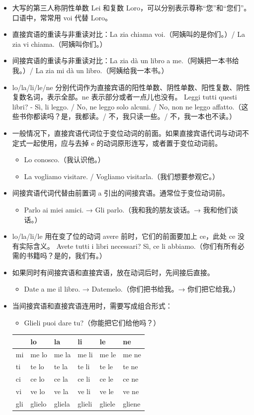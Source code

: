 \documentclass[UTF8,a4paper,titlepage,10pt]{report}
\begin{document}
\begin{enumerate}
\begin{itemize}
\item 大写的第三人称阴性单数 Lei 和复数 Loro，可以分别表示尊称“您”和“您们”。口语中，常常用 voi 代替 Loro。
\item 直接宾语的重读与非重读对比：La zia chiama voi.（阿姨叫的是你们。）/ La zia vi chiama.（阿姨叫你们。）
\item 间接宾语的重读与非重读对比：La zia dà un libro a me.（阿姨把一本书给我。）/ La zia mi dà un libro.（阿姨给我一本书。）
\item lo/la/li/le/ne 分别代词作为直接宾语的阳性单数、阴性单数、阳性复数、阴性复数名词，表示全部。ne 表示部分或者一点儿也没有。
Leggi tutti questi libri? - Sì, li leggo. / No, ne leggo solo alcuni. / No, non ne leggo affatto.（这些书你都读吗？是，我都读。/ 不，我只读一些。/ 不，我一本也不读。）
\item 一般情况下，直接宾语代词位于变位动词的前面。如果直接宾语代词与动词不定式一起使用，应与去掉 e 的动词原形连写，或者置于变位动词前。
\begin{itemize}
\item Lo conosco.（我认识他。）
\item La vogliamo visitare. / Vogliamo visitarla.（我们想要参观它。）
\end{itemize}
\item 间接宾语代词代替由前置词 a 引出的间接宾语。通常位于变位动词前。
\begin{itemize}
\item Parlo ai miei amici. → Gli parlo.（我和我的朋友谈话。→ 我和他们谈话。）
\end{itemize}
\item lo/la/li/le 用在变了位的动词 avere 前时，它们的前面要加上 ce，此处 ce 没有实际含义。
Avete tutti i libri necessari? Sì, ce li abbiamo.（你们有所有必需的书籍吗？是的，我们有。）
\item 如果同时有间接宾语和直接宾语，放在动词后时，先间接后直接。
\begin{itemize}
\item Date a me il libro. → Datemelo.（你们把书给我。→ 你们把它给我。）
\end{itemize}
\item 当间接宾语和直接宾语连用时，需要写成组合形式：
\begin{itemize}
\item Glieli puoi dare tu?（你能把它们给他吗？）
\end{itemize}
\begin{center}
\begin{tabular}{llllll}
 & lo & la & li & le & ne\\[0pt]
\hline
mi & me lo & me la & me li & me le & me ne\\[0pt]
ti & te lo & te la & te li & te le & te ne\\[0pt]
ci & ce lo & ce la & ce li & ce le & ce ne\\[0pt]
vi & ve lo & ve la & ve li & ve le & ve ne\\[0pt]
gli & glielo & gliela & glieli & gliele & gliene\\[0pt]
\end{tabular}
\end{center}
\end{itemize}


\end{enumerate}
\end{document}
